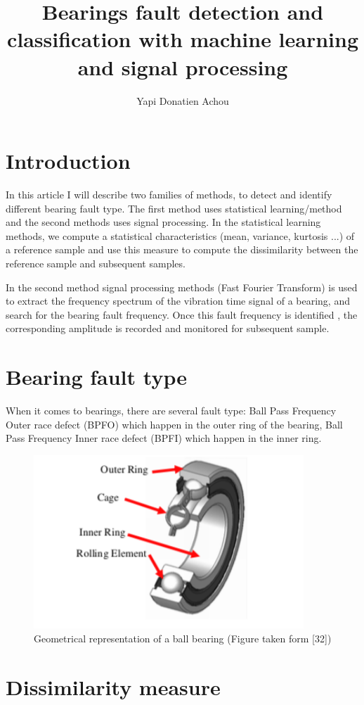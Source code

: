 \documentclass[11pt, oneside]{article}   	%
\title{Bearings fault detection and classification with machine learning and signal processing}
\author{Yapi Donatien Achou}
\begin{document}
\maketitle
\section{Introduction}
In this article I will describe two families of methods, to detect and identify different bearing fault type.
The first method uses statistical learning/method and the second methods uses signal processing.
In the statistical learning methods, we compute a statistical characteristics (mean, variance, kurtosis ...) of a reference sample
and use this measure to compute the dissimilarity between the reference sample and subsequent 
samples.\par
\begin{flushleft}
In the second method signal processing methods (Fast Fourier Transform) is used to extract the frequency spectrum of the vibration time signal of a bearing, and search for the bearing fault frequency. Once this fault frequency is identified , the corresponding 
amplitude is recorded and monitored for subsequent sample.
\end{flushleft}



\section{Bearing fault type}
When it comes to bearings, there are several fault type: Ball Pass Frequency Outer race defect (BPFO) which happen in the outer ring of the bearing, Ball Pass Frequency Inner race defect  (BPFI) which happen in the inner ring.

\begin{figure}[H] %
   \centering
   \includegraphics[width=4in]{bearing.png} 
   \caption{Geometrical representation of a ball bearing (Figure taken form [32])}
   \label{fig:bearing}
\end{figure}

\section{Dissimilarity measure}
\end{document}

